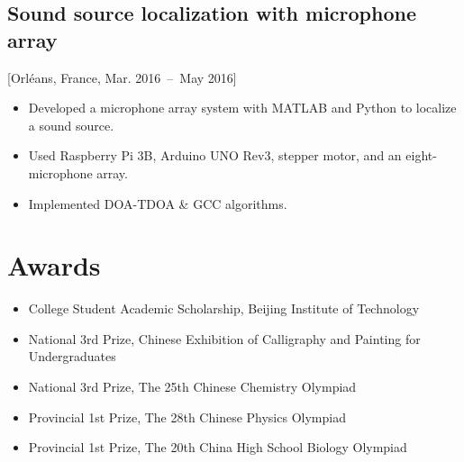 \documentclass{mycv}
\begin{document}
\subsection{Sound source localization with microphone array}[Orl\'eans, France, Mar. 2016~--~May 2016]

\begin{itemize}
  \itemsep 0em
  \item Developed a microphone array system with MATLAB and Python to localize a sound source.
  \item Used Raspberry Pi 3B, Arduino UNO Rev3, stepper motor, and an eight-microphone array.
  \item Implemented DOA-TDOA \& GCC algorithms. 
\end{itemize}



\vspace{-0.5em}

\section{Awards}

\begin{itemize}
  \itemsep 0em
  \item College Student Academic Scholarship, Beijing Institute of Technology 
  \item National 3rd Prize, Chinese Exhibition of Calligraphy and Painting for Undergraduates 
  \item National 3rd Prize, The 25th Chinese Chemistry Olympiad 
  \item Provincial 1st Prize, The 28th Chinese Physics Olympiad 
  \item Provincial 1st Prize, The 20th China High School Biology Olympiad 
\end{itemize}
\end{document}
